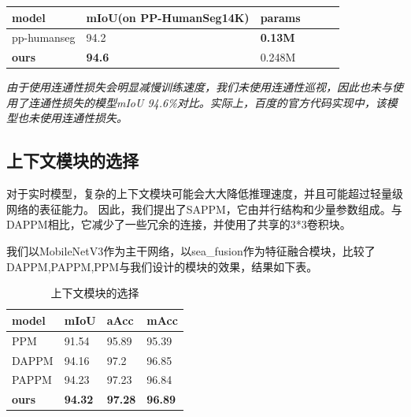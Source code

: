 \documentclass[11pt]{article}
\begin{document}
\begin{table}[H]
  \centering
  \begin{tabular}{|l|l|l|l|l|l|}
  \hline
      model & mIoU(on PP-HumanSeg14K) & params \\ \hline
      pp-humanseg&94.2&\textbf{0.13M}\\\hline
      \textbf{ours}&\textbf{94.6}&0.248M\\\hline
  \end{tabular}
\end{table}

\textit{由于使用连通性损失会明显减慢训练速度，我们未使用连通性巡视，因此也未与使用了连通性损失的模型mIoU 94.6\%对比。实际上，百度的官方代码实现中，该模型也未使用连通性损失。}


\subsection{上下文模块的选择}

对于实时模型，复杂的上下文模块可能会大大降低推理速度，并且可能超过轻量级网络的表征能力。
因此，我们提出了SAPPM，它由并行结构和少量参数组成。与DAPPM相比，它减少了一些冗余的连接，并使用了共享的3*3卷积块。

我们以MobileNetV3作为主干网络，以sea_fusion作为特征融合模块，比较了DAPPM,PAPPM,PPM与我们设计的模块的效果，结果如下表。
\begin{table}[!ht]
  \centering
  \begin{tabular}{|l|l|l|l|}
  \hline
      model & mIoU & aAcc & mAcc \\ \hline
      PPM & 91.54 & 95.89 & 95.39 \\ \hline
      DAPPM & 94.16 & 97.2 & 96.85 \\ \hline
      PAPPM & 94.23 & 97.23 & 96.84 \\ \hline
      \textbf{ours} & \textbf{94.32} & \textbf{97.28} & \textbf{96.89} \\ \hline
  \end{tabular}
\caption{上下文模块的选择}
  \label{fig:01}
\end{table}
\end{document}
